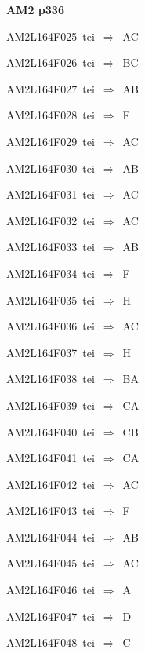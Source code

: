 \par\vfill\eject
{\bf\hfill AM2 p336\hfill\hbox{}}\par\bigskip
{\sixrm AM2L164F025\ {\sixit tei}\ }$\Rightarrow$\ AC\par\smallskip
{\sixrm AM2L164F026\ {\sixit tei}\ }$\Rightarrow$\ BC\par\smallskip
{\sixrm AM2L164F027\ {\sixit tei}\ }$\Rightarrow$\ AB\par\smallskip
{\sixrm AM2L164F028\ {\sixit tei}\ }$\Rightarrow$\ F\par\smallskip
{\sixrm AM2L164F029\ {\sixit tei}\ }$\Rightarrow$\ AC\par\smallskip
{\sixrm AM2L164F030\ {\sixit tei}\ }$\Rightarrow$\ AB\par\smallskip
{\sixrm AM2L164F031\ {\sixit tei}\ }$\Rightarrow$\ AC\par\smallskip
{\sixrm AM2L164F032\ {\sixit tei}\ }$\Rightarrow$\ AC\par\smallskip
{\sixrm AM2L164F033\ {\sixit tei}\ }$\Rightarrow$\ AB\par\smallskip
{\sixrm AM2L164F034\ {\sixit tei}\ }$\Rightarrow$\ F\par\smallskip
{\sixrm AM2L164F035\ {\sixit tei}\ }$\Rightarrow$\ H\par\smallskip
{\sixrm AM2L164F036\ {\sixit tei}\ }$\Rightarrow$\ AC\par\smallskip
{\sixrm AM2L164F037\ {\sixit tei}\ }$\Rightarrow$\ H\par\smallskip
{\sixrm AM2L164F038\ {\sixit tei}\ }$\Rightarrow$\ BA\par\smallskip
{\sixrm AM2L164F039\ {\sixit tei}\ }$\Rightarrow$\ CA\par\smallskip
{\sixrm AM2L164F040\ {\sixit tei}\ }$\Rightarrow$\ CB\par\smallskip
{\sixrm AM2L164F041\ {\sixit tei}\ }$\Rightarrow$\ CA\par\smallskip
{\sixrm AM2L164F042\ {\sixit tei}\ }$\Rightarrow$\ AC\par\smallskip
{\sixrm AM2L164F043\ {\sixit tei}\ }$\Rightarrow$\ F\par\smallskip
{\sixrm AM2L164F044\ {\sixit tei}\ }$\Rightarrow$\ AB\par\smallskip
{\sixrm AM2L164F045\ {\sixit tei}\ }$\Rightarrow$\ AC\par\smallskip
{\sixrm AM2L164F046\ {\sixit tei}\ }$\Rightarrow$\ A\par\smallskip
{\sixrm AM2L164F047\ {\sixit tei}\ }$\Rightarrow$\ D\par\smallskip
{\sixrm AM2L164F048\ {\sixit tei}\ }$\Rightarrow$\ C\par\smallskip

